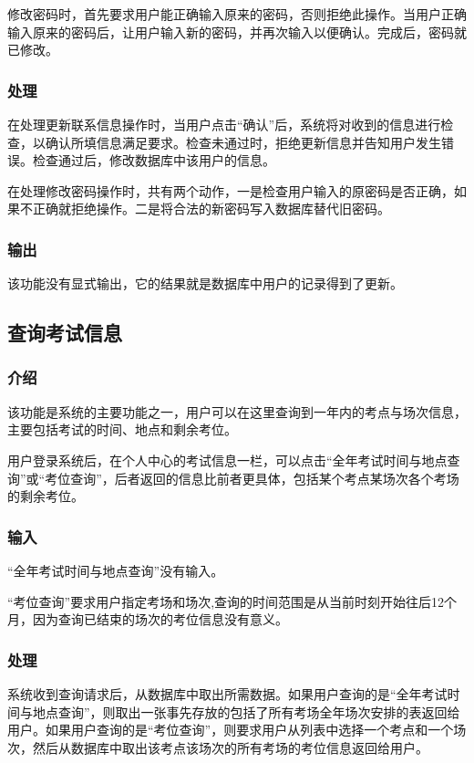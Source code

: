 修改密码时，首先要求用户能正确输入原来的密码，否则拒绝此操作。当用户正确输入原来的密码后，让用户输入新的密码，并再次输入以便确认。完成后，密码就已修改。

\subsubsection{处理}
在处理更新联系信息操作时，当用户点击“确认”后，系统将对收到的信息进行检查，以确认所填信息满足要求。检查未通过时，拒绝更新信息并告知用户发生错误。检查通过后，修改数据库中该用户的信息。

在处理修改密码操作时，共有两个动作，一是检查用户输入的原密码是否正确，如果不正确就拒绝操作。二是将合法的新密码写入数据库替代旧密码。

\subsubsection{输出}
该功能没有显式输出，它的结果就是数据库中用户的记录得到了更新。

\subsection{查询考试信息}

\subsubsection{介绍}
该功能是系统的主要功能之一，用户可以在这里查询到一年内的考点与场次信息，主要包括考试的时间、地点和剩余考位。

用户登录系统后，在个人中心的考试信息一栏，可以点击“全年考试时间与地点查询”或“考位查询”，后者返回的信息比前者更具体，包括某个考点某场次各个考场的剩余考位。

\subsubsection{输入}
“全年考试时间与地点查询”没有输入。

“考位查询”要求用户指定考场和场次,查询的时间范围是从当前时刻开始往后12个月，因为查询已结束的场次的考位信息没有意义。

\subsubsection{处理}
系统收到查询请求后，从数据库中取出所需数据。如果用户查询的是“全年考试时间与地点查询”，则取出一张事先存放的包括了所有考场全年场次安排的表返回给用户。如果用户查询的是“考位查询”，则要求用户从列表中选择一个考点和一个场次，然后从数据库中取出该考点该场次的所有考场的考位信息返回给用户。

